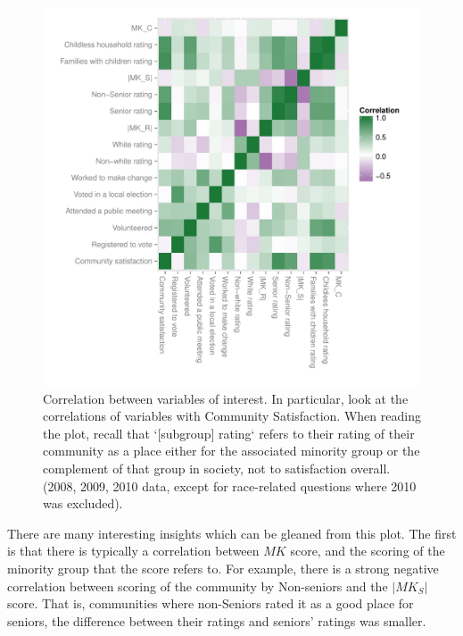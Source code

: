 \documentclass[smallextended]{svjour3}\usepackage[]{graphicx}\usepackage[]{color}
\newenvironment{knitrout}{}{} %
\begin{document}
\begin{knitrout}
\color{fgcolor}\begin{figure}

{\centering \includegraphics[width=\linewidth]{figure/correlationmatrix-1} 

}

\caption[Correlation between variables of interest]{Correlation between variables of interest. In particular, look at the correlations of variables with Community Satisfaction. When reading the plot, recall that `[subgroup] rating` refers to their rating of their community as a place either for the associated minority group or the complement of that group in society, not to satisfaction overall. (2008, 2009, 2010 data, except for race-related questions where 2010 was excluded).}\label{fig:correlationmatrix}
\end{figure}


\end{knitrout}

There are many interesting insights which can be gleaned from this plot. The first is that there is typically a correlation between $MK$ score, and the scoring of the minority group that the score refers to. For example, there is a strong negative correlation between scoring of the community by Non-seniors and the $|MK_S|$ score. That is, communities where non-Seniors rated it as a good place for seniors, the difference between their ratings and seniors' ratings was smaller. 
\end{document}
